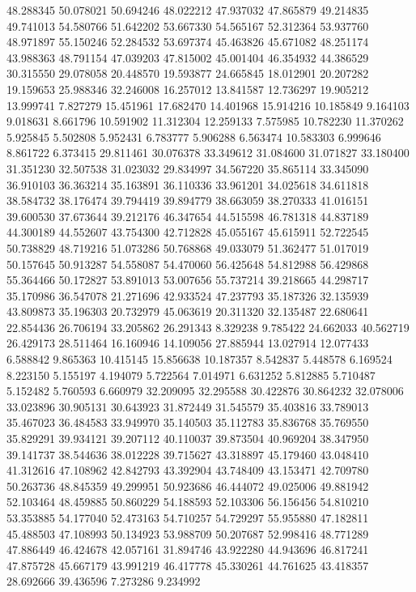 48.288345
50.078021
50.694246
48.022212
47.937032
47.865879
49.214835
49.741013
54.580766
51.642202
53.667330
54.565167
52.312364
53.937760
48.971897
55.150246
52.284532
53.697374
45.463826
45.671082
48.251174
43.988363
48.791154
47.039203
47.815002
45.001404
46.354932
44.386529
30.315550
29.078058
20.448570
19.593877
24.665845
18.012901
20.207282
19.159653
25.988346
32.246008
16.257012
13.841587
12.736297
19.905212
13.999741
7.827279
15.451961
17.682470
14.401968
15.914216
10.185849
9.164103
9.018631
8.661796
10.591902
11.312304
12.259133
7.575985
10.782230
11.370262
5.925845
5.502808
5.952431
6.783777
5.906288
6.563474
10.583303
6.999646
8.861722
6.373415
29.811461
30.076378
33.349612
31.084600
31.071827
33.180400
31.351230
32.507538
31.023032
29.834997
34.567220
35.865114
33.345090
36.910103
36.363214
35.163891
36.110336
33.961201
34.025618
34.611818
38.584732
38.176474
39.794419
39.894779
38.663059
38.270333
41.016151
39.600530
37.673644
39.212176
46.347654
44.515598
46.781318
44.837189
44.300189
44.552607
43.754300
42.712828
45.055167
45.615911
52.722545
50.738829
48.719216
51.073286
50.768868
49.033079
51.362477
51.017019
50.157645
50.913287
54.558087
54.470060
56.425648
54.812988
56.429868
55.364466
50.172827
53.891013
53.007656
55.737214
39.218665
44.298717
35.170986
36.547078
21.271696
42.933524
47.237793
35.187326
32.135939
43.809873
35.196303
20.732979
45.063619
20.311320
32.135487
22.680641
22.854436
26.706194
33.205862
26.291343
8.329238
9.785422
24.662033
40.562719
26.429173
28.511464
16.160946
14.109056
27.885944
13.027914
12.077433
6.588842
9.865363
10.415145
15.856638
10.187357
8.542837
5.448578
6.169524
8.223150
5.155197
4.194079
5.722564
7.014971
6.631252
5.812885
5.710487
5.152482
5.760593
6.660979
32.209095
32.295588
30.422876
30.864232
32.078006
33.023896
30.905131
30.643923
31.872449
31.545579
35.403816
33.789013
35.467023
36.484583
33.949970
35.140503
35.112783
35.836768
35.769550
35.829291
39.934121
39.207112
40.110037
39.873504
40.969204
38.347950
39.141737
38.544636
38.012228
39.715627
43.318897
45.179460
43.048410
41.312616
47.108962
42.842793
43.392904
43.748409
43.153471
42.709780
50.263736
48.845359
49.299951
50.923686
46.444072
49.025006
49.881942
52.103464
48.459885
50.860229
54.188593
52.103306
56.156456
54.810210
53.353885
54.177040
52.473163
54.710257
54.729297
55.955880
47.182811
45.488503
47.108993
50.134923
53.988709
50.207687
52.998416
48.771289
47.886449
46.424678
42.057161
31.894746
43.922280
44.943696
46.817241
47.875728
45.667179
43.991219
46.417778
45.330261
44.761625
43.418357
28.692666
39.436596
7.273286
9.234992
